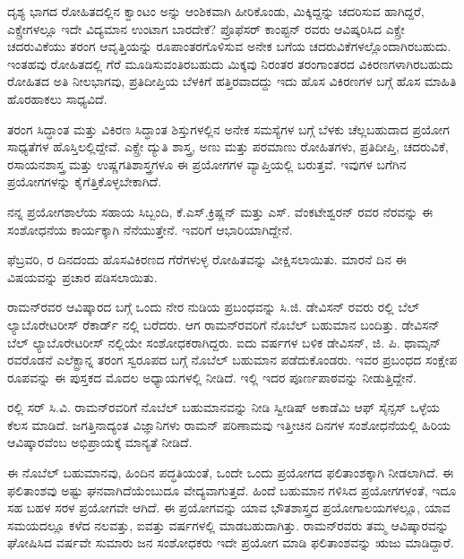
ದೃಶ್ಯ ಭಾಗದ ರೋಹಿತದಲ್ಲಿನ ಕ್ವಾಂಟಂ ಅನ್ನು ಆಂಶಿಕವಾಗಿ ಹೀರಿಕೊಂಡು, ಮಿಕ್ಕಿದ್ದನ್ನು ಚದರಿಸುವ ಹಾಗಿದ್ದರೆ, ಎಕ್ಸ್\enginline{-}ರೇಗಳಲ್ಲೂ ಇದೇ ವಿದ್ಯಮಾನ ಉಂಟಾಗ ಬಾರದೇಕೆ? ಪ್ರೊಫೆಸರ್ ಕಾಂಪ್ಟನ್ ರವರು ಆವಿಷ್ಕರಿಸಿದ ಎಕ್ಸ್\enginline{-}ರೇ ಚದರುವಿಕೆಯು ತರಂಗ ಆವೃತ್ತಿಯನ್ನು ರೂಪಾಂತರಗೊಳಿಸುವ ಅನೇಕ ಬಗೆಯ ಚದರುವಿಕೆಗಳಲ್ಲೊಂದಾಗಿರಬಹುದು. ಇಂತಹವು ರೋಹಿತದಲ್ಲಿ ಗೆರೆ ಮೂಡಿಸುವಂತಿರಬಹುದು ಮಿಕ್ಕವು ನಿರಂತರ ತರಂಗಾಂತರದ ವಿಕಿರಣಗಳಾಗಿರಬಹುದು ರೋಹಿತದ ಅತಿ ನೀಲಭಾಗವು, ಪ್ರತಿದೀಪ್ತಿಯ ಬೆಳಕಿಗೆ ಹತ್ತಿರವಾದದ್ದು ಇದು ಹೊಸ ವಿಕಿರಣಗಳ ಬಗ್ಗೆ ಹೊಸ ಮಾಹಿತಿ ಹೊರಹಾಕಲು ಸಾಧ್ಯವಿದೆ.



ತರಂಗ ಸಿದ್ಧಾಂತ ಮತ್ತು ವಿಕಿರಣ ಸಿದ್ಧಾಂತ ಶಿಸ್ತುಗಳಲ್ಲಿನ ಅನೇಕ ಸಮಸ್ಯೆಗಳ ಬಗ್ಗೆ ಬೆಳಕು ಚೆಲ್ಲಬಹುದಾದ ಪ್ರಯೋಗ ಸಾಧ್ಯತೆಗಳ ಹೊಸ್ತಿಲಲ್ಲಿದ್ದೇವೆ. ಎಕ್ಸ್\enginline{-}ರೇ ದ್ಯುತಿ ಶಾಸ್ತ್ರ, ಅಣು ಮತ್ತು ಪರಮಾಣು ರೋಹಿತಗಳು, ಪ್ರತಿದೀಪ್ತಿ, ಚದರುವಿಕೆ, ರಸಾಯನಶಾಸ್ತ್ರ ಮತ್ತು ಉಷ್ಣಗತಿಶಾಸ್ತ್ರಗಳೂ ಈ ಪ್ರಯೋಗಗಳ ವ್ಯಾಪ್ತಿಯಲ್ಲಿ ಬರುತ್ತವೆ. ಇವುಗಳ ಬಗೆಗಿನ ಪ್ರಯೋಗಗಳನ್ನು ಕೈಗೆತ್ತಿಕೊಳ್ಳಬೇಕಾಗಿದೆ.

ನನ್ನ ಪ್ರಯೋಗಶಾಲೆಯ ಸಹಾಯ ಸಿಬ್ಬಂದಿ, ಕೆ.ಎಸ್.ಕ್ರಿಷ್ಣನ್ ಮತ್ತು ಎಸ್. ವೆಂಕಟೇಶ್ವರನ್ ರವರ ನೆರವನ್ನು ಈ ಸಂಶೋಧನೆಯ ಕಾರ್ಯಕ್ಕಾಗಿ ನೆನೆಯುತ್ತೇನೆ. ಇವರಿಗೆ ಆಭಾರಿಯಾಗಿದ್ದೇನೆ.

 ಫೆಬ್ರವರಿ,  ರ ದಿನದಂದು ಹೊಸವಿಕಿರಣದ ಗೆರೆಗಳುಳ್ಳ ರೋಹಿತವನ್ನು ವೀಕ್ಷಿಸಲಾಯಿತು. ಮಾರನೆ ದಿನ ಈ ವಿಷಯವನ್ನು ಪ್ರಚಾರ ಪಡಿಸಲಾಯಿತು.



ರಾಮನ್‍ರವರ ಆವಿಷ್ಕಾರದ ಬಗ್ಗೆ ಒಂದು ನೇರ ನುಡಿಯ ಪ್ರಬಂಧವನ್ನು ಸಿ.ಜಿ. ಡೇವಿಸನ್ ರವರು ರಲ್ಲಿ ಬೆಲ್ ಲ್ಯಾಬೊರೇಟರೀಸ್ ರೆಕಾರ್ಡ್ ನಲ್ಲಿ ಬರೆದರು. ಆಗ ರಾಮನ್‍ರವರಿಗೆ ನೊಬೆಲ್ ಬಹುಮಾನ ಬಂದಿತ್ತು. ಡೇವಿಸನ್ ಬೆಲ್ ಲ್ಯಾಬೊರೇಟರೀಸ್ ನಲ್ಲಿಯೇ ಸಂಶೋಧಕರಾಗಿದ್ದರು. ಐದು ವರ್ಷಗಳ ಬಳಿಕ ಡೇವಿಸನ್, ಜಿ. ಪಿ. ಥಾಮ್ಸನ್ ರವರೊಡನೆ ಎಲೆಕ್ಟ್ರಾನ್ನ ತರಂಗ ಸ್ವರೂಪದ ಬಗ್ಗೆ ನೊಬೆಲ್ ಬಹುಮಾನ ಪಡೆದುಕೊಂಡರು. ಇವರ ಪ್ರಬಂಧದ ಸಂಕ್ಷೇಪ ರೂಪವನ್ನು ಈ ಪುಸ್ತಕದ ಮೊದಲ ಅಧ್ಯಾಯಗಳಲ್ಲಿ ನೀಡಿದೆ. ಇಲ್ಲಿ ಇದರ ಪೂರ್ಣಪಾಠವನ್ನು ನೀಡುತ್ತಿದ್ದೇನೆ.

ರಲ್ಲಿ ಸರ್ ಸಿ.ವಿ. ರಾಮನ್‍ರವರಿಗೆ ನೊಬೆಲ್ ಬಹುಮಾನವನ್ನು ನೀಡಿ ಸ್ವೀಡಿಷ್ ಅಕಾಡೆಮಿ ಆಫ್ ಸೈನ್ಸಸ್ ಒಳ್ಳೆಯ ಕೆಲಸ ಮಾಡಿದೆ. ಜಗತ್ತಿನಾದ್ಯಂತ ವಿಜ್ಞಾನಿಗಳು ರಾಮನ್ ಪರಿಣಾಮವು ಇತ್ತೀಚಿನ ದಿನಗಳ ಸಂಶೋಧನೆಯಲ್ಲಿ ಹಿರಿಯ ಆವಿಷ್ಕಾರವೆಂಬ ಅಭಿಪ್ರಾಯಕ್ಕೆ ಮಾನ್ಯತೆ ನೀಡಿದೆ.

ಈ ನೊಬೆಲ್ ಬಹುಮಾನವು, ಹಿಂದಿನ ಪದ್ಧತಿಯಂತೆ, ಒಂದೇ ಒಂದು ಪ್ರಯೋಗದ ಫಲಿತಾಂಶಕ್ಕಾಗಿ ನೀಡಲಾಗಿದೆ. ಈ ಫಲಿತಾಂಶವು ಅಷ್ಟು ಘನವಾಗಿದೆಯೆಂಬುದೂ ವೇದ್ಯವಾಗುತ್ತದೆ. ಹಿಂದೆ ಬಹುಮಾನ ಗಳಿಸಿದ ಪ್ರಯೋಗಗಳಂತೆ, ಇದೂ ಸಹ ಬಹಳ ಸರಳ ಪ್ರಯೋಗವೇ ಆಗಿದೆ. ಈ ಪ್ರಯೋಗವನ್ನು ಯಾವ ಭೌತಶಾಸ್ತ್ರದ ಪ್ರಯೋಗಾಲಯಗಳಲ್ಲೂ, ಯಾವ ಸಮಯದಲ್ಲೂ ಕಳೆದ ನಲವತ್ತು, ಐವತ್ತು ವರ್ಷಗಳಲ್ಲಿ ಮಾಡಬಹುದಾಗಿತ್ತು. ರಾಮನ್‍ರವರು ತಮ್ಮ ಆವಿಷ್ಕಾರವನ್ನು ಘೋಷಿಸಿದ ವರ್ಷವೇ ಸುಮಾರು  ಜನ ಸಂಶೋಧಕರು ಇದೇ ಪ್ರಯೋಗ ಮಾಡಿ ಫಲಿತಾಂಶವನ್ನು ಋಜು ಮಾಡಿದ್ದಾರೆ.

